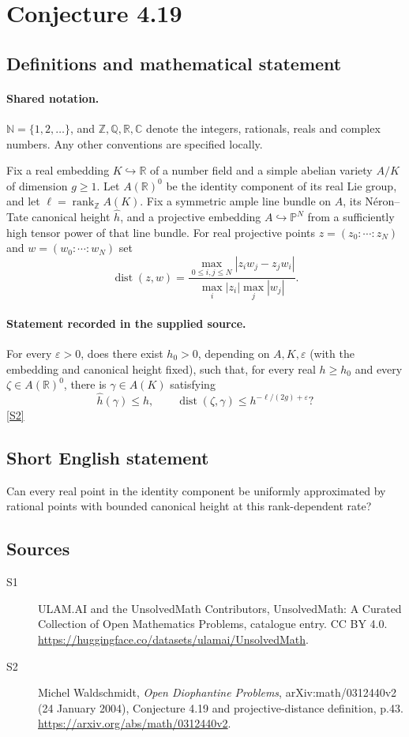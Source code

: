 \documentclass[11pt]{article}
\newcommand{\sref}[2]{\hyperlink{source:#1:#2}{[S#2]}}
\begin{document}
\section{Conjecture 4.19}\label{statement}

\subsection{Definitions and mathematical statement}

\paragraph{Shared notation.}$\mathbb N=\{1,2,\ldots\}$, and $\mathbb Z,\mathbb Q,\mathbb R,\mathbb C$ denote the integers, rationals, reals and complex numbers. Any other conventions are specified locally.


Fix a real embedding $K\hookrightarrow\mathbb R$ of a number field and a simple abelian variety $A/K$ of dimension $g\ge1$. Let $A(\mathbb R)^0$ be the identity component of its real Lie group, and let $\ell=\operatorname{rank}_{\mathbb Z}A(K)$. Fix a symmetric ample line bundle on $A$, its Néron--Tate canonical height $\widehat h$, and a projective embedding $A\hookrightarrow\mathbb P^N$ from a sufficiently high tensor power of that line bundle. For real projective points $z=(z_0:\cdots:z_N)$ and $w=(w_0:\cdots:w_N)$ set
\[
\operatorname{dist}(z,w)=\frac{\max_{0\le i,j\le N}|z_iw_j-z_jw_i|}{\max_i|z_i|\max_j|w_j|}.
\]
\paragraph{Statement recorded in the supplied source.}
For every $\varepsilon>0$, does there exist $h_0>0$, depending on $A,K,\varepsilon$ (with the embedding and canonical height fixed), such that, for every real $h\ge h_0$ and every $\zeta\in A(\mathbb R)^0$, there is $\gamma\in A(K)$ satisfying
\[
\widehat h(\gamma)\le h,\qquad \operatorname{dist}(\zeta,\gamma)\le h^{-\ell/(2g)+\varepsilon}?
\] \sref{statement}{2}

\subsection{Short English statement}
Can every real point in the identity component be uniformly approximated by rational points with bounded canonical height at this rank-dependent rate?
\subsection{Sources}
\begin{description}
\item[\hypertarget{source:statement:1}{S1}] ULAM.AI and the UnsolvedMath Contributors, UnsolvedMath: A Curated Collection of Open Mathematics Problems, catalogue entry. CC BY 4.0. \url{https://huggingface.co/datasets/ulamai/UnsolvedMath}.
\item[\hypertarget{source:statement:2}{S2}] Michel Waldschmidt, \emph{Open Diophantine Problems}, arXiv:math/0312440v2 (24 January 2004), Conjecture 4.19 and projective-distance definition, p.43. \url{https://arxiv.org/abs/math/0312440v2}.
\end{description}
\label{end:statement}
\end{document}
